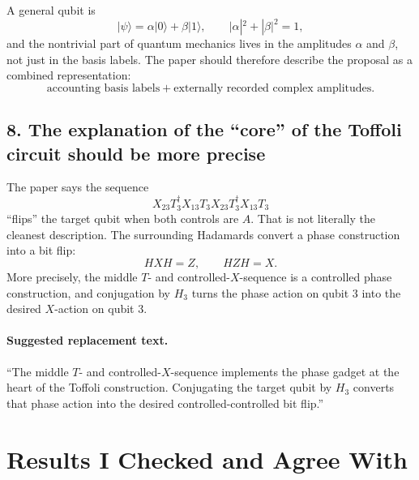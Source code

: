 \documentclass[11pt]{article}
\begin{document}
A general qubit is
\[
|\psi\rangle=\alpha|0\rangle+\beta|1\rangle,
\qquad
|\alpha|^2+|\beta|^2=1,
\]
and the nontrivial part of quantum mechanics lives in the amplitudes \(\alpha\) and \(\beta\), not just in the basis labels. The paper should therefore describe the proposal as a combined representation:
\[
\text{accounting basis labels} + \text{externally recorded complex amplitudes}.
\]

\subsection*{8. The explanation of the ``core'' of the Toffoli circuit should be more precise}

The paper says the sequence
\[
X_{23}T_3^\dagger X_{13}T_3X_{23}T_3^\dagger X_{13}T_3
\]
``flips'' the target qubit when both controls are \(A\). That is not literally the cleanest description. The surrounding Hadamards convert a phase construction into a bit flip:
\[
H X H = Z,
\qquad
H Z H = X.
\]
More precisely, the middle \(T\)- and controlled-\(X\)-sequence is a controlled phase construction, and conjugation by \(H_3\) turns the phase action on qubit 3 into the desired \(X\)-action on qubit 3.

\paragraph{Suggested replacement text.}
``The middle \(T\)- and controlled-\(X\)-sequence implements the phase gadget at the heart of the Toffoli construction. Conjugating the target qubit by \(H_3\) converts that phase action into the desired controlled-controlled bit flip.''

\section*{Results I Checked and Agree With}
\end{document}
